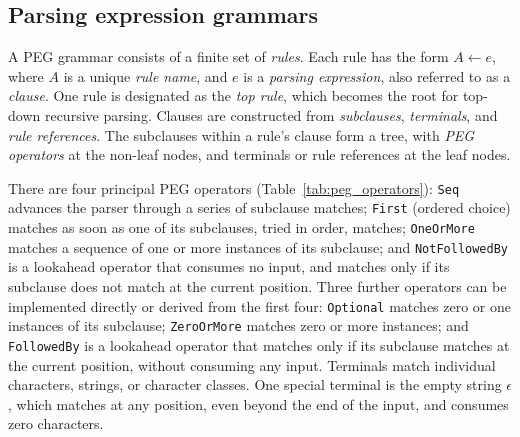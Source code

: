 \documentclass[manuscript]{acmart}
\newcommand{\cd}[1]{\texttt{#1}}
\begin{document}
\subsection{Parsing expression grammars}
\label{sec:peg_grammars}

A PEG grammar consists of a finite set of \emph{rules}. Each rule has the form $A \leftarrow e$, where $A$ is a unique \emph{rule name}, and $e$ is a \emph{parsing expression}, also referred to as a \emph{clause}. One rule is designated as the \emph{top rule}, which becomes the root for top-down recursive parsing. Clauses are constructed from \emph{subclauses}, \emph{terminals}, and \emph{rule references}. The subclauses within a rule's clause form a tree, with \emph{PEG operators} at the non-leaf nodes, and terminals or rule references at the leaf nodes.

There are four principal PEG operators (Table~\ref{tab:peg_operators}): \cd{Seq} advances the parser through a series of subclause matches; \cd{First} (ordered choice) matches as soon as one of its subclauses, tried in order, matches; \cd{OneOrMore} matches a sequence of one or more instances of its subclause; and \cd{NotFollowedBy} is a lookahead operator that consumes no input, and matches only if its subclause does not match at the current position. Three further operators can be implemented directly or derived from the first four: \cd{Optional} matches zero or one instances of its subclause; \cd{ZeroOrMore} matches zero or more instances; and \cd{FollowedBy} is a lookahead operator that matches only if its subclause matches at the current position, without consuming any input. Terminals match individual characters, strings, or character classes. One special terminal is the empty string $\epsilon$, which matches at any position, even beyond the end of the input, and consumes zero characters.
\end{document}
